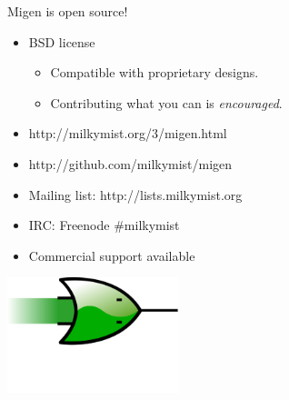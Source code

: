 \documentclass{beamer}
\begin{document}
\begin{frame}
Migen is open source!
\begin{itemize}
\item BSD license
\begin{itemize}
\item Compatible with proprietary designs.
\item Contributing what you can is \textit{encouraged}.
\end{itemize}
\item http://milkymist.org/3/migen.html
\item http://github.com/milkymist/migen
\item Mailing list: http://lists.milkymist.org
\item IRC: Freenode \#milkymist
\item Commercial support available
\end{itemize}

\centering \includegraphics[width=5cm]{migen_logo.png}

\end{frame}
\end{document}
